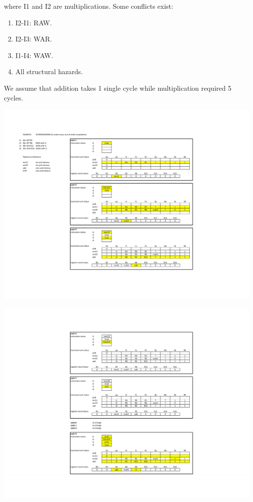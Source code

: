 where I1 and I2 are multiplications. Some conflicts exist:
\begin{enumerate}
  \item I2-I1: RAW.
  \item I2-I3: WAR.
  \item I1-I4: WAW.
  \item All structural hazards.
\end{enumerate}
We assume that addition takes 1 single cycle while multiplication required 5
cycles.\\
\begin{minipage}{\textwidth}
\hspace{-2.5cm} \includegraphics[width=1.5\linewidth]{img/img3/score1}
\end{minipage}
\begin{minipage}{\textwidth}
\hspace{-7cm} \includegraphics[width=1.7\linewidth]{img/img3/score2}
\end{minipage}

